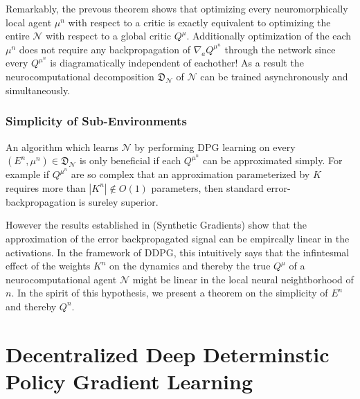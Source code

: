 \documentclass{article} %
\numberwithin{equation}{subsection}
\numberwithin{theorem}{subsection}
\theoremstyle{named}
\def\scriptn{{\mathcal N}}
\begin{document}
Remarkably, the prevous theorem shows that optimizing every neuromorphically local agent $\mu^n$ with respect
to a critic is exactly equivalent to optimizing the entire $\scriptn$ with respect to a global critic $Q^\mu$.
Additionally optimization of the each $\mu^n$ does not require any backpropagation of $\nabla_a Q^{\mu^n}$ through the network since every $Q^{\mu^n}$ is diagramatically independent of eachother! As a result the neurocomputational decomposition $\mathfrak{D}_\scriptn$ of $\scriptn$ can be trained asynchronously and simultaneously.

\subsubsection{Simplicity of Sub-Environments}
An algorithm which learns $\scriptn$ by performing DPG learning on every $(E^n, \mu^n) \in \mathfrak{D}_\scriptn$ is only beneficial if each $Q^{\mu^n}$ can be approximated simply. For example if $Q^{\mu^n}$ are so complex that an approximation parameterized by $K$ requires more than $|K^n| \notin O(1)$ parameters, then standard error-backpropagation is sureley superior.

However the results established in (Synthetic Gradients) show that the approximation of the error backpropagated signal can be empircally linear in the activations. In the framework of DDPG, this intuitively says that the infintesmal effect of the weights $K^n$ on the dynamics and thereby the true $Q^\mu$ of a neurocomputational agent $\scriptn$ might be linear in the local neural neightborhood of $n$.
In the spirit of this hypothesis, we present a theorem on the simplicity of $E^n$ and thereby $Q^n$.


\section{Decentralized Deep Determinstic Policy Gradient Learning}


\end{document}
